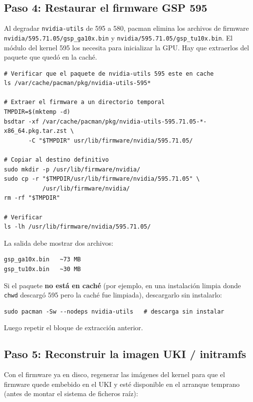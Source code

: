 \documentclass[12pt,a4paper]{article}
\begin{document}
\subsection{Paso 4: Restaurar el firmware GSP 595}

Al degradar \texttt{nvidia-utils} de 595 a 580, pacman elimina los archivos
de firmware \texttt{nvidia/595.71.05/gsp\_ga10x.bin} y
\texttt{nvidia/595.71.05/gsp\_tu10x.bin}. El módulo del kernel 595 los necesita
para inicializar la GPU. Hay que extraerlos del paquete que quedó en la caché.

\begin{lstlisting}[style=bash]
# Verificar que el paquete de nvidia-utils 595 este en cache
ls /var/cache/pacman/pkg/nvidia-utils-595*

# Extraer el firmware a un directorio temporal
TMPDIR=$(mktemp -d)
bsdtar -xf /var/cache/pacman/pkg/nvidia-utils-595.71.05-*-x86_64.pkg.tar.zst \
       -C "$TMPDIR" usr/lib/firmware/nvidia/595.71.05/

# Copiar al destino definitivo
sudo mkdir -p /usr/lib/firmware/nvidia/
sudo cp -r "$TMPDIR/usr/lib/firmware/nvidia/595.71.05" \
           /usr/lib/firmware/nvidia/
rm -rf "$TMPDIR"

# Verificar
ls -lh /usr/lib/firmware/nvidia/595.71.05/
\end{lstlisting}

La salida debe mostrar dos archivos:
\begin{lstlisting}
gsp_ga10x.bin   ~73 MB
gsp_tu10x.bin   ~30 MB
\end{lstlisting}

\begin{nota}
Si el paquete \textbf{no está en caché} (por ejemplo, en una instalación
limpia donde \texttt{chwd} descargó 595 pero la caché fue limpiada),
descargarlo sin instalarlo:
\begin{lstlisting}[style=bash]
sudo pacman -Sw --nodeps nvidia-utils   # descarga sin instalar
\end{lstlisting}
Luego repetir el bloque de extracción anterior.
\end{nota}

\subsection{Paso 5: Reconstruir la imagen UKI / initramfs}

Con el firmware ya en disco, regenerar las imágenes del kernel para que
el firmware quede embebido en el UKI y esté disponible en el arranque
temprano (antes de montar el sistema de ficheros raíz):
\end{document}
